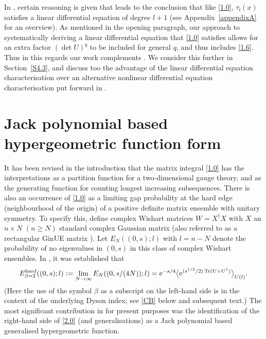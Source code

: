\documentclass[pdftex]{sigma}
\numberwithin{equation}{section}
\theoremstyle{definition}
\begin{document}
In \cite{KW24b}, certain reasoning is given that leads to the conclusion that like \eqref{1.0}, $\tau_{l}(x)$ satisfies a linear differential equation of degree $l+1$ (see Appendix~\ref{appendixA} for an overview).
As mentioned in the opening paragraph,
our approach to systematically deriving a linear differential equation that \eqref{1.0} satisfies allows for an extra factor $(\det U)^q$ to be included for general $q$, and thus
includes \eqref{1.6}. Thus in this regards our work complements \cite{KW24b}. We consider this further in Section~\ref{S4.3}, and discuss too the advantage of the linear differential equation characterisation over an alternative nonlinear
differential equation characterisation put forward in \cite{FW06}.

\section{Jack polynomial based hypergeometric function form}\label{sec2}

It has been revised in the introduction that the matrix integral \eqref{1.0} has the interpretations as a partition function for a two-dimensional gauge theory, and as the generating function for counting longest increasing subsequences. There is also an occurrence of \eqref{1.0} as a limiting gap probability at the hard edge ({neighbourhood of the origin}) of a positive definite matrix ensemble with unitary symmetry. To specify this, define complex Wishart matrices $W = X^\dagger X$ with $X$ an $n \times N$ $(n \ge N)$ standard complex Gaussian matrix (also referred to as a rectangular GinUE matrix \cite{BF25}). Let {$E_N((0,s);l)$} with $l = n - N$ denote the probability of no eigenvalues in $(0,s)$
{in this class of complex Wishart ensembles.}
In \cite{Fo93c}, it was established that
\begin{equation}\label{2.0}
E_{\beta = 2}^{\rm hard}((0,s);l) :=
\lim_{N \to \infty} E_N((0,s/(4N));l) =
{\rm e}^{-s/4}
\big \langle {\rm e}^{(s^{1/2}/2) \operatorname{Tr}(U + U^\dagger)} \big \rangle_{U(l)}.
\end{equation}
{(Here the use of the symbol $\beta$ as a subscript on the left-hand side is in the context of the underlying Dyson index; see \eqref{CB} below and subsequent text.)}
The most significant contribution in \cite{Fo93c} for present purposes was the identification of the right-hand side of \eqref{2.0}
(and generalisations) as a Jack polynomial based generalised hypergeometric function.
\end{document}
